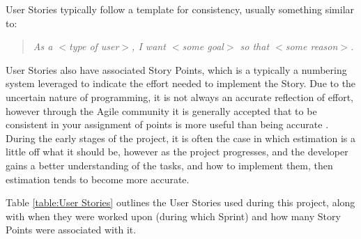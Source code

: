 User Stories typically follow a template for consistency, usually something similar to:

\begin{quotation}
  \textit{As a $<$type of user$>$, I want $<$some goal$>$ so that $<$some reason$>$.} \cite{user_story}
\end{quotation}

User Stories also have associated Story Points, which is a typically a numbering system leveraged to indicate the effort needed to implement the Story. Due to the uncertain nature of programming, it is not always an accurate reflection of effort, however through the Agile community it is generally accepted that to be consistent in your assignment of points is more useful than being accurate \cite{estimation}. During the early stages of the project, it is often the case in which estimation is a little off what it should be, however as the project progresses, and the developer gains a better understanding of the tasks, and how to implement them, then estimation tends to become more accurate.

Table \ref{table:User Stories} outlines the User Stories used during this project, along with when they were worked upon (during which Sprint) and how many Story Points were associated with it.

